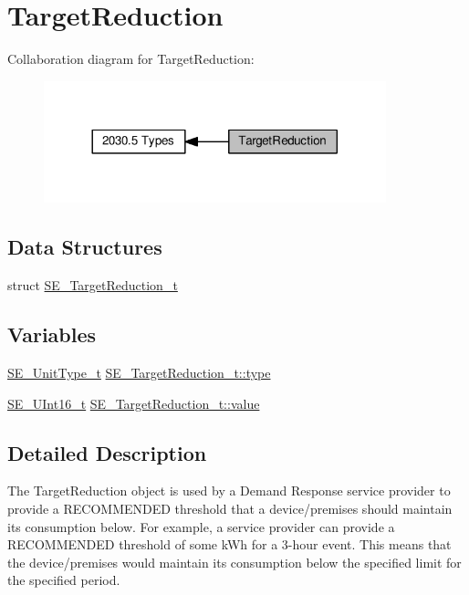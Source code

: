 \hypertarget{group__TargetReduction}{}\section{Target\+Reduction}
\label{group__TargetReduction}
Collaboration diagram for Target\+Reduction\+:\nopagebreak
\begin{figure}[H]
\begin{center}
\leavevmode
\includegraphics[width=281pt]{group__TargetReduction}
\end{center}
\end{figure}
\subsection*{Data Structures}
\begin{DoxyCompactItemize}
\item 
struct \hyperlink{structSE__TargetReduction__t}{S\+E\+\_\+\+Target\+Reduction\+\_\+t}
\end{DoxyCompactItemize}
\subsection*{Variables}
\begin{DoxyCompactItemize}
\item 
\hyperlink{group__UnitType_ga402dc1288733e4df30c6ae69e947cebe}{S\+E\+\_\+\+Unit\+Type\+\_\+t} \hyperlink{group__TargetReduction_ga62a38286d35648e7858f31c933bdbefe}{S\+E\+\_\+\+Target\+Reduction\+\_\+t\+::type}
\item 
\hyperlink{group__UInt16_gac68d541f189538bfd30cfaa712d20d29}{S\+E\+\_\+\+U\+Int16\+\_\+t} \hyperlink{group__TargetReduction_ga0e051bb112da6ceb397749dd75275896}{S\+E\+\_\+\+Target\+Reduction\+\_\+t\+::value}
\end{DoxyCompactItemize}


\subsection{Detailed Description}
The Target\+Reduction object is used by a Demand Response service provider to provide a R\+E\+C\+O\+M\+M\+E\+N\+D\+ED threshold that a device/premises should maintain its consumption below. For example, a service provider can provide a R\+E\+C\+O\+M\+M\+E\+N\+D\+ED threshold of some k\+Wh for a 3-\/hour event. This means that the device/premises would maintain its consumption below the specified limit for the specified period. 

